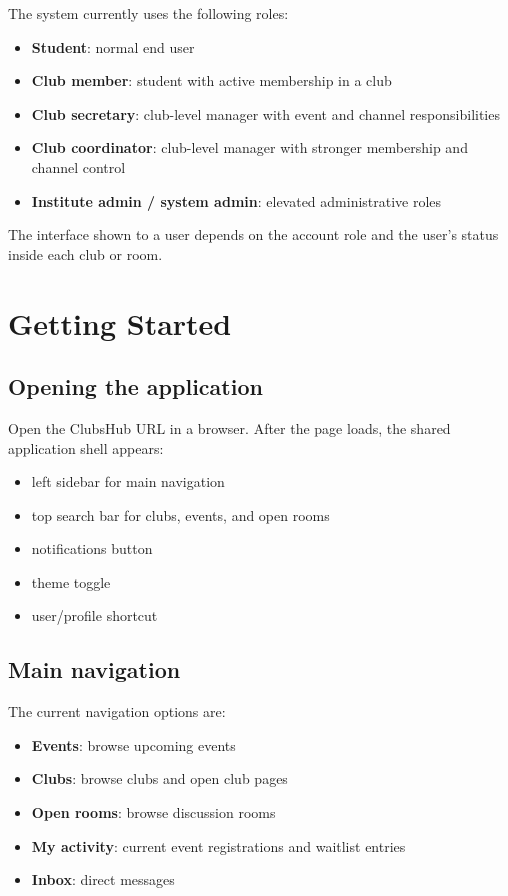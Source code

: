 \documentclass[11pt,a4paper]{article}
\begin{document}
The system currently uses the following roles:

\begin{itemize}[leftmargin=1.5em]
  \item \textbf{Student}: normal end user
  \item \textbf{Club member}: student with active membership in a club
  \item \textbf{Club secretary}: club-level manager with event and channel responsibilities
  \item \textbf{Club coordinator}: club-level manager with stronger membership and channel control
  \item \textbf{Institute admin / system admin}: elevated administrative roles
\end{itemize}

The interface shown to a user depends on the account role and the user's status inside each club or room.

\section{Getting Started}

\subsection{Opening the application}

Open the ClubsHub URL in a browser. After the page loads, the shared application shell appears:

\begin{itemize}[leftmargin=1.5em]
  \item left sidebar for main navigation
  \item top search bar for clubs, events, and open rooms
  \item notifications button
  \item theme toggle
  \item user/profile shortcut
\end{itemize}

\subsection{Main navigation}

The current navigation options are:

\begin{itemize}[leftmargin=1.5em]
  \item \textbf{Events}: browse upcoming events
  \item \textbf{Clubs}: browse clubs and open club pages
  \item \textbf{Open rooms}: browse discussion rooms
  \item \textbf{My activity}: current event registrations and waitlist entries
  \item \textbf{Inbox}: direct messages
\end{itemize}
\end{document}
